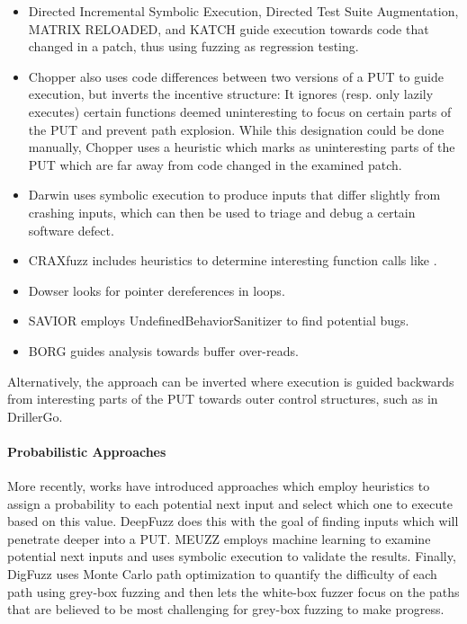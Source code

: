 \documentclass{article}
\begin{document}
\begin{multicols}{2}
    \begin{itemize}
        \item Directed Incremental Symbolic Execution\cite{DiSE}, Directed Test Suite Augmentation\cite{DTSA}, MATRIX RELOADED\cite{MATRIXRELOADED}, and KATCH\cite{KATCH} guide execution towards code that changed in a patch, thus using fuzzing as regression testing.
        \item Chopper\cite{Chopped} also uses code differences between two versions of a PUT to guide execution, but inverts the incentive structure: It ignores (resp. only lazily executes) certain functions deemed uninteresting to focus on certain parts of the PUT and prevent path explosion. While this designation could be done manually, Chopper\cite{Chopped} uses a heuristic which marks as uninteresting parts of the PUT which are far away from code changed in the examined patch.
        \item Darwin\cite{Darwin} uses symbolic execution to produce inputs that differ slightly from crashing inputs, which can then be used to triage and debug a certain software defect.
        \item CRAXfuzz\cite{CRAXfuzz} includes heuristics to determine interesting function calls like .
        \item Dowser\cite{Dowser} looks for pointer dereferences in loops.
        \item SAVIOR\cite{SAVIOR} employs UndefinedBehaviorSanitizer\cite{UndefinedBehaviorSanitizer} to find potential bugs.
        \item BORG\cite{BORG} guides analysis towards buffer over-reads.
    \end{itemize}

    Alternatively, the approach can be inverted where execution is guided backwards from interesting parts of the PUT towards outer control structures, such as in DrillerGo\cite{DrillerGo}.

    \paragraph{Probabilistic Approaches}
    More recently, works have introduced approaches which employ heuristics to assign a probability to each potential next input and select which one to execute based on this value. DeepFuzz\cite{DeepFuzz} does this with the goal of finding inputs which will penetrate deeper into a PUT. MEUZZ\cite{MEUZZ} employs machine learning to examine potential next inputs and uses symbolic execution to validate the results. Finally, DigFuzz\cite{DigFuzz} uses Monte Carlo path optimization to quantify the difficulty of each path using grey-box fuzzing and then lets the white-box fuzzer focus on the paths that are believed to be most challenging for grey-box fuzzing to make progress.


\end{multicols}
\end{document}

